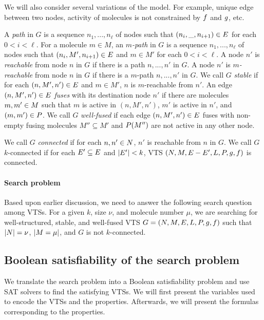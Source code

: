 We will also consider several variations of the model.
%
For example, unique edge between two nodes, activity of molecules is
not constrained by $f$ and $g$, etc.
%

A {\em path} in $G$ is a sequence $n_1,...,n_\ell$ of nodes 
such that $(n_i,\_,n_{i+1}) \in E$ for each $ 0 < i < \ell$.
%
For a molecule $m \in M$,
an {\em $m$-path} in $G$ is a sequence $n_1,...,n_\ell$ of nodes 
such that $(n_i,M',n_{i+1}) \in E$ and $m \in M'$ for
each $ 0 < i < \ell$.
%
A node $n'$ is {\em reachable} from node $n$ in $G$ if there is a path
$n,...,n'$ in $G$.
%
A node $n'$ is {\em $m$-reachable} from node $n$ in $G$ if there is a
$m$-path $n,...,n'$ in $G$.
%
We call $G$ {\em stable} if for each $(n,M',n') \in E$ and $m \in M'$,
$n$ is $m$-reachable from $n'$.
%
An edge $(n,M',n') \in E$ {\em fuses} with its destination node $n'$
if there are molecules $m,m' \in M$ such that $m$ is active in
$(n,M',n')$, $m'$ is active in $n'$, and $(m,m') \in P$.
%
We call $G$ {\em well-fused} if each edge $(n,M',n') \in E$ fuses
with non-empty fusing molecules $M'' \subseteq M'$
and $P(M'')$ are not active in any other node.



%
We call $G$ {\em connected} if for each $n,n' \in N$,
$n'$ is reachable from $n$ in $G$.
%
We call $G$ $k$-connected if for each $E' \subseteq E$ and $|E'| < k$,
VTS $(N,M,E-E',L,P,g,f)$ is connected.


\paragraph{Search problem}
Based upon earlier discussion, we need to answer the following search
question among VTSs.
For a given $k$, size $\nu$, and molecule number $\mu$,
we are searching for well-structured, stable, and well-fused VTS
$G = (N,M,E,L,P,g,f)$ such that
$|N| = \nu$, $|M = \mu|$, and
$G$ is not $k$-connected.    


\subsection{Boolean satisfiability of the search problem}

We translate the search problem into a Boolean satisfiability
problem and use SAT solvers to find the satisfying VTSs.
%
We will first present the variables used to encode the
VTSs and the properties.
%
Afterwards, we will present the formulas corresponding to the
properties.

